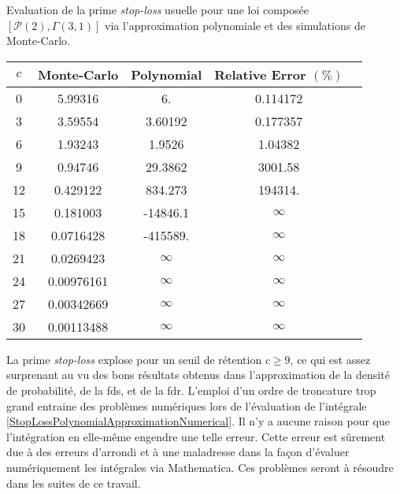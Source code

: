 	\begin{tableth}
		\caption[Calcul de la prime \textit{stop-loss} pour une loi $\left(\mathcal{P}(2),\Gamma(3,1)\right)$]{Evaluation de la prime \textit{stop-loss} usuelle pour une loi composée $\left[\mathcal{P}(2),\Gamma(3,1)\right]$ via l'approximation polynomiale et des simulations de Monte-Carlo.}
			\label{TableStopLossPolynomialCompoundPoissonGamma}
		\begin{tabular}{|c||c|c|c|c|}
\hline
$c$ & Monte-Carlo & Polynomial & Relative Error $(\%)$ \\
\hline
\hline
0 & 5.99316 & 6. & 0.114172 \\
 3 & 3.59554 & 3.60192 & 0.177357 \\
 6 & 1.93243 & 1.9526 & 1.04382 \\
 9 & 0.94746 & 29.3862 & 3001.58 \\
 12 & 0.429122 & 834.273 & 194314. \\
 15 & 0.181003 & -14846.1 & $\infty$\\
 18 & 0.0716428 & -415589. & $\infty$\\
 21 & 0.0269423 &$\infty$ & $\infty$\\
 24 & 0.00976161 & $\infty$ & $\infty$\\
 27 & 0.00342669 & $\infty$ & $\infty$\\
 30 & 0.00113488 & $\infty$ & $\infty$\\
\hline
		\end{tabular}
	\end{tableth}
La prime \textit{stop-loss} explose pour un seuil de rétention $c\geq9$, ce qui est assez surprenant au vu des bons résultats obtenus dans l\rq{}approximation de la densité de probabilité, de la \gls{fds}, et de la \gls{fdr}. L\rq{}emploi d\rq{}un ordre de troncature trop grand entraine des problèmes numériques lors de l\rq{}évaluation de l\rq{}intégrale \eqref{StopLossPolynomialApproximationNumerical}. Il n\rq{}y a aucune raison pour que l\rq{}intégration en elle-même engendre une telle erreur. Cette erreur est sûrement due à des erreurs d\rq{}arrondi et à une maladresse dans la façon d\rq{}évaluer numériquement les intégrales via Mathematica. Ces problèmes seront à résoudre dans les suites de ce travail.     

